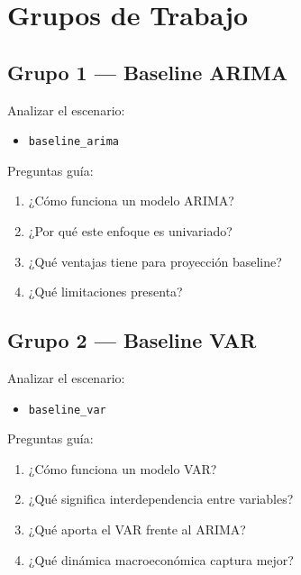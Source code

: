 \documentclass[12pt]{article}
\begin{document}
\section*{Grupos de Trabajo}


\subsection*{Grupo 1 — Baseline ARIMA}

Analizar el escenario:

\begin{itemize}
    \item \texttt{baseline\_arima}
\end{itemize}

Preguntas guía:

\begin{enumerate}
    \item ¿Cómo funciona un modelo ARIMA?
    \item ¿Por qué este enfoque es univariado?
    \item ¿Qué ventajas tiene para proyección baseline?
    \item ¿Qué limitaciones presenta?
\end{enumerate}


\subsection*{Grupo 2 — Baseline VAR}

Analizar el escenario:

\begin{itemize}
    \item \texttt{baseline\_var}
\end{itemize}

Preguntas guía:

\begin{enumerate}
    \item ¿Cómo funciona un modelo VAR?
    \item ¿Qué significa interdependencia entre variables?
    \item ¿Qué aporta el VAR frente al ARIMA?
    \item ¿Qué dinámica macroeconómica captura mejor?
\end{enumerate}

\end{document}
